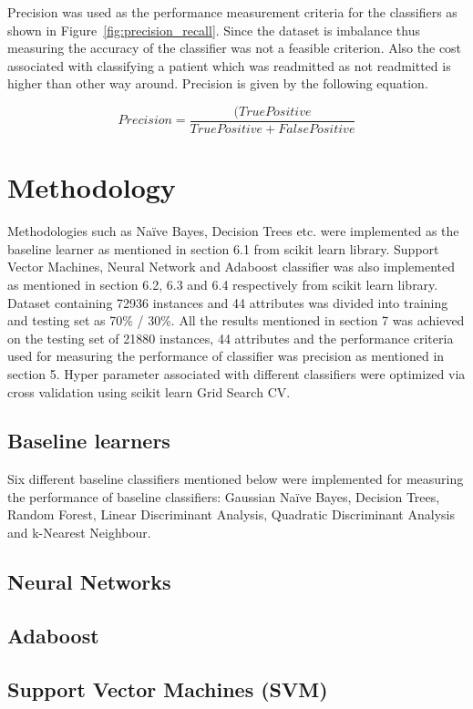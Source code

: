 \documentclass[conference]{IEEEtran}
\begin{document}
Precision was used as the performance measurement criteria for the classifiers as shown in Figure~\ref{fig:precision_recall}. Since the dataset is imbalance thus measuring the accuracy of the classifier was not a feasible criterion. Also the cost associated with classifying a patient which was readmitted as not readmitted is higher than other way around. Precision is given by the following equation.

\[ Precision = \frac{(True Positive}{True Positive + False Positive} \]

\section{Methodology}

Methodologies such as Naïve Bayes, Decision Trees etc. were implemented as the baseline learner as mentioned in section 6.1 from scikit learn library. Support Vector Machines, Neural Network and Adaboost classifier was also implemented as mentioned in section 6.2, 6.3 and 6.4 respectively from scikit learn library. Dataset containing 72936 instances and 44 attributes was divided into training and testing set as 70\% / 30\%. All the results mentioned in section 7 was achieved on the testing set of 21880 instances, 44 attributes and the performance criteria used for measuring the performance of classifier was precision as mentioned in section 5. Hyper parameter associated with different classifiers were optimized via cross validation using scikit learn Grid Search CV.

\subsection{Baseline learners}

Six different baseline classifiers mentioned below were implemented for measuring the performance of baseline classifiers: Gaussian Naïve Bayes, Decision Trees, Random Forest, Linear Discriminant Analysis, Quadratic Discriminant Analysis and k-Nearest Neighbour.

\subsection{Neural Networks}

\subsection{Adaboost}

\subsection{Support Vector Machines (SVM)}
\end{document}
